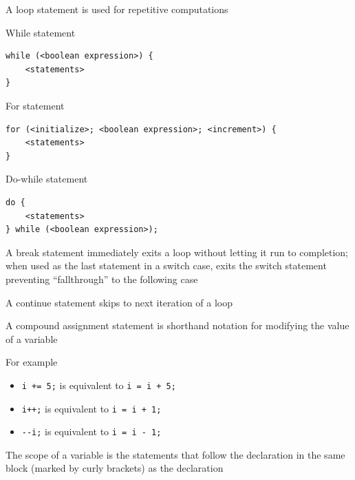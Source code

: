 \documentclass[8pt,a4paper,compress]{beamer}
\begin{document}
\begin{frame}[fragile]
\pause

A loop statement is used for repetitive computations

\pause\bigskip

While statement

\smallskip

\begin{lstlisting}[language={},style=focusin]
while (<boolean expression>) {
    <statements>
}
\end{lstlisting}

\pause\bigskip

For statement

\smallskip

\begin{lstlisting}[language={},style=focusin]
for (<initialize>; <boolean expression>; <increment>) {
    <statements>
}
\end{lstlisting}

\pause\bigskip

Do-while statement

\smallskip

\begin{lstlisting}[language={},style=focusin]
do {
    <statements>
} while (<boolean expression>);
\end{lstlisting}

\pause\bigskip

A break statement immediately exits a loop without letting it run to completion; when used as the last statement in a switch case, exits the switch statement preventing ``fallthrough'' to the following case

\pause\bigskip

A continue statement skips to next iteration of a loop
\end{frame}

\begin{frame}[fragile]
\pause

A compound assignment statement is shorthand notation for modifying the value of a variable

\pause\bigskip

For example
\begin{itemize}
\pause
\item \lstinline{i += 5;} is equivalent to \lstinline{i = i + 5;}

\pause
\item \lstinline{i++;} is equivalent to \lstinline{i = i + 1;}

\pause
\item \lstinline{--i;} is equivalent to \lstinline{i = i - 1;}
\end{itemize}

\pause\bigskip

The scope of a variable is the statements that follow the declaration in the same block (marked by curly brackets) as the declaration
\end{frame}
\end{document}
